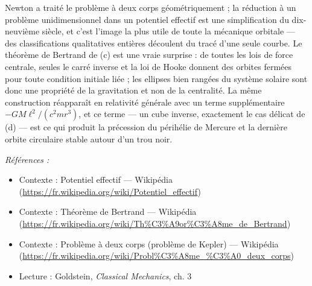 \documentclass[11pt]{article}
\newenvironment{refs}{\par\small\noindent\emph{Références :}\begin{itemize}\setlength\itemsep{0pt}}{\end{itemize}\normalsize}
\begin{document}
\noindent Newton a traité le problème à deux corps géométriquement ; la réduction à un
problème unidimensionnel dans un potentiel effectif est une simplification du dix-neuvième
siècle, et c'est l'image la plus utile de toute la mécanique orbitale --- des classifications
qualitatives entières découlent du tracé d'une seule courbe. Le théorème de Bertrand de (c) est
une vraie surprise : de toutes les lois de force centrale, seules le carré inverse et la loi de
Hooke donnent des orbites fermées pour toute condition initiale liée ; les ellipses bien rangées
du système solaire sont donc une propriété de la gravitation et non de la centralité. La même
construction réapparaît en relativité générale avec un terme supplémentaire
$-G M \ell^2 / (c^2 m r^3)$, et ce terme --- un cube inverse, exactement le cas délicat de (d) ---
est ce qui produit la précession du périhélie de Mercure et la dernière orbite circulaire stable
autour d'un trou noir.

\begin{refs}
\item Contexte : Potentiel effectif --- Wikipédia (\url{https://fr.wikipedia.org/wiki/Potentiel_effectif})
\item Contexte : Théorème de Bertrand --- Wikipédia (\url{https://fr.wikipedia.org/wiki/Th%C3%A9or%C3%A8me_de_Bertrand})
\item Contexte : Problème à deux corps (problème de Kepler) --- Wikipédia (\url{https://fr.wikipedia.org/wiki/Probl%C3%A8me_%C3%A0_deux_corps})
\item Lecture : Goldstein, \textit{Classical Mechanics}, ch. 3
\end{refs}

\bigskip
\end{document}
